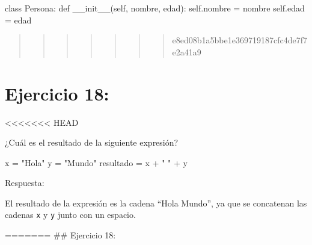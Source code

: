 \documentclass[
  a4paper,
  onepage,
  openany]{scrreprt}
\newenvironment{Shaded}{\begin{snugshade}}{\end{snugshade}}
\newcommand{\FunctionTok}[1]{\textcolor[rgb]{0.28,0.35,0.67}{#1}}
\newcommand{\KeywordTok}[1]{\textcolor[rgb]{0.00,0.23,0.31}{#1}}
\newcommand{\NormalTok}[1]{\textcolor[rgb]{0.00,0.23,0.31}{#1}}
\newcommand{\OperatorTok}[1]{\textcolor[rgb]{0.37,0.37,0.37}{#1}}
\newcommand{\StringTok}[1]{\textcolor[rgb]{0.13,0.47,0.30}{#1}}
\newcommand{\VariableTok}[1]{\textcolor[rgb]{0.07,0.07,0.07}{#1}}
\begin{document}
\begin{Shaded}
\begin{Highlighting}[]
\KeywordTok{class}\NormalTok{ Persona:}
    \KeywordTok{def} \FunctionTok{\_\_init\_\_}\NormalTok{(}\VariableTok{self}\NormalTok{, nombre, edad):}
        \VariableTok{self}\NormalTok{.nombre }\OperatorTok{=}\NormalTok{ nombre}
        \VariableTok{self}\NormalTok{.edad }\OperatorTok{=}\NormalTok{ edad}
\end{Highlighting}
\end{Shaded}

\begin{quote}
\begin{quote}
\begin{quote}
\begin{quote}
\begin{quote}
\begin{quote}
\begin{quote}
e8ed08b1a5bbe1e369719187cfc4de7f7e2a41a9
\end{quote}
\end{quote}
\end{quote}
\end{quote}
\end{quote}
\end{quote}
\end{quote}

\hypertarget{ejercicio-18}{%
\chapter{Ejercicio 18:}\label{ejercicio-18}}

\textless\textless\textless\textless\textless\textless\textless{} HEAD

¿Cuál es el resultado de la siguiente expresión?

\begin{Shaded}
\begin{Highlighting}[]
\NormalTok{x }\OperatorTok{=} \StringTok{"Hola"}
\NormalTok{y }\OperatorTok{=} \StringTok{"Mundo"}
\NormalTok{resultado }\OperatorTok{=}\NormalTok{ x }\OperatorTok{+} \StringTok{" "} \OperatorTok{+}\NormalTok{ y}
\end{Highlighting}
\end{Shaded}

Respuesta:

El resultado de la expresión es la cadena ``Hola Mundo'', ya que se
concatenan las cadenas \texttt{x} y \texttt{y} junto con un espacio.

======= \#\# Ejercicio 18:
\end{document}
